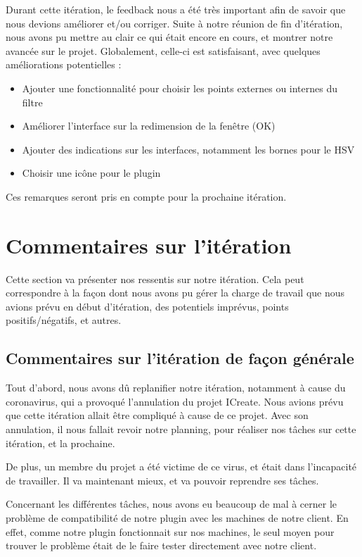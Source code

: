 \documentclass[12pt,titlepage,french]{article}
\begin{document}
Durant cette itération, le feedback nous a été très important afin de savoir que nous devions améliorer et/ou corriger. Suite à notre réunion de fin d'itération, nous avons pu mettre au clair ce qui était encore en cours, et montrer notre avancée sur le projet. Globalement, celle-ci est satisfaisant, avec quelques améliorations potentielles :

\begin{itemize}
    \item Ajouter une fonctionnalité pour choisir les points externes ou internes du filtre
    \item Améliorer l'interface sur la redimension de la fenêtre (OK)
    \item Ajouter des indications sur les interfaces, notamment les bornes pour le HSV
    \item Choisir une icône pour le plugin
\end{itemize}

Ces remarques seront pris en compte pour la prochaine itération.

\section{Commentaires sur l'itération}

Cette section va présenter nos ressentis sur notre itération. Cela peut correspondre à la façon dont nous avons pu gérer la charge de travail que nous avions prévu en début d'itération, des potentiels imprévus, points positifs/négatifs, et autres.

\subsection{Commentaires sur l'itération de façon générale}

Tout d'abord, nous avons dû replanifier notre itération, notamment à cause du coronavirus, qui a provoqué l'annulation du projet ICreate. Nous avions prévu que cette itération allait être compliqué à cause de ce projet. Avec son annulation, il nous fallait revoir notre planning, pour réaliser nos tâches sur cette itération, et la prochaine. \newline

De plus, un membre du projet a été victime de ce virus, et était dans l'incapacité de travailler. Il va maintenant mieux, et va pouvoir reprendre ses tâches. \newline

Concernant les différentes tâches, nous avons eu beaucoup de mal à cerner le problème de compatibilité de notre plugin avec les machines de notre client. En effet, comme notre plugin fonctionnait sur nos machines, le seul moyen pour trouver le problème était de le faire tester directement avec notre client. \newline
\end{document}
